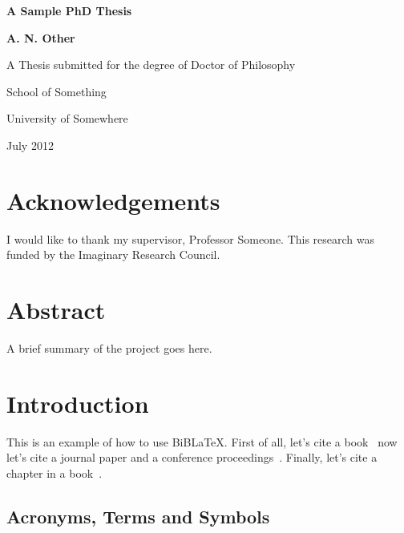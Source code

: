 \documentclass[oneside,12pt]{scrbook}
\theoremstyle{break}
\begin{document}
\begin{titlepage}
\centering
\vspace*{1in}
\begin{Large}\bfseries
A Sample PhD Thesis\par
\end{Large}
\vspace{1.5in}
\begin{large}\bfseries
A. N. Other\par
\end{large}
\vfill
A Thesis submitted for the degree of Doctor of Philosophy
\par
\vspace{0.5in}
School of Something
\par
University of Somewhere
\par
\vspace{0.5in}
July 2012
\par
\end{titlepage}

\doublespacing

\frontmatter
\tableofcontents
\listoffigures
\listoftables
\lstlistoflistings

\chapter{Acknowledgements}

I would like to thank my supervisor, Professor Someone. This
research was funded by the Imaginary Research Council.

\chapter{Abstract}

A brief summary of the project goes here.

\mainmatter

\chapter{Introduction}
\label{ch:intro}

This is an example of how to use BiB\LaTeX.
First of all, let's cite a book~\cite{wainwright93}
now let's cite a journal paper and a conference
proceedings~\cite{cawley96,talbot97}.
Finally, let's cite a chapter in a book~\cite[Chapter 9]{goossens97}.

\section{Acronyms, Terms and Symbols}
\end{document}
